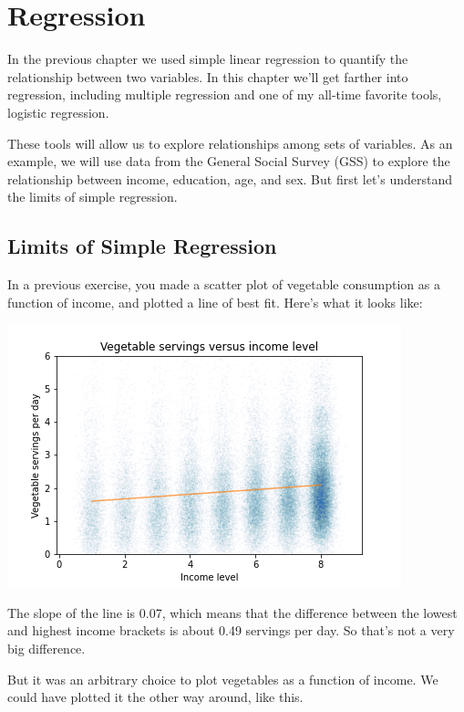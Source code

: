 \hypertarget{regression}{%
\chapter{Regression}\label{regression}}

In the previous chapter we used simple linear regression to quantify the
relationship between two variables. In this chapter we'll get farther
into regression, including multiple regression and one of my all-time
favorite tools, logistic regression.

These tools will allow us to explore relationships among sets of
variables. As an example, we will use data from the General Social
Survey (GSS) to explore the relationship between income, education, age,
and sex. But first let's understand the limits of simple regression.

\hypertarget{limits-of-simple-regression}{%
\section{Limits of Simple
Regression}\label{limits-of-simple-regression}}

In a previous exercise, you made a scatter plot of vegetable consumption
as a function of income, and plotted a line of best fit. Here's what it
looks like:

\includegraphics{chapters/figs/fig09-01.png}

The slope of the line is 0.07, which means that the difference between
the lowest and highest income brackets is about 0.49 servings per day.
So that's not a very big difference.

But it was an arbitrary choice to plot vegetables as a function of
income. We could have plotted it the other way around, like this.

